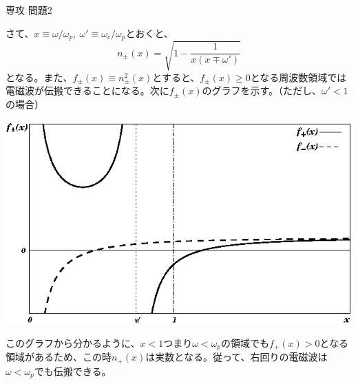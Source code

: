 \documentclass[fleqn]{jbook}
\begin{document}
\begin{answer}{専攻 問題2}{}
\begin{subanswers}
さて、$x\equiv \omega/\omega_p,\ \omega'\equiv \omega_c/\omega_p$とおくと、
\[
n_{\pm}(x) = \sqrt{1-\frac{1}{x(x\mp\omega')}}
\]
となる。また、$f_{\pm}(x)\equiv n_{\pm}^2(x)$とすると、$f_{\pm}(x)\ge 0$となる周波数領域では電磁波が伝搬できることになる。次に$f_{\pm}(x)$のグラフを示す。（ただし、$\omega'<1$の場合）
\begin{center}
\includegraphics[clip]{1999phy2-1.eps}
\end{center}
このグラフから分かるように、$x<1$つまり$\omega<\omega_p$の領域でも$f_+(x)>0$となる領域があるため、この時$n_+(x)$は実数となる。従って、右回りの電磁波は$\omega<\omega_p$でも伝搬できる。

\end{subanswers}
\end{answer}
\end{document}

